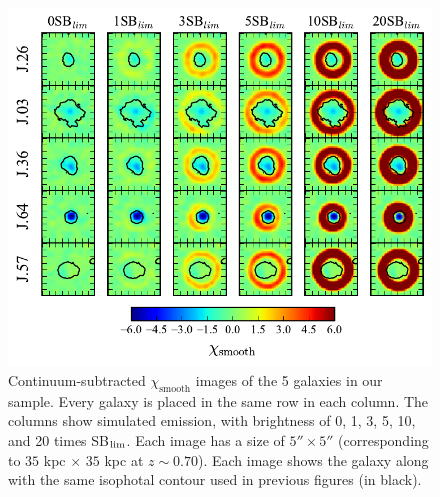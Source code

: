 \documentclass[twocolumn]{aastex61}
\begin{document}
\begin{figure}[p]
\centering
\includegraphics[scale=1.2]{../Figures/sigmas.pdf}
\caption{Continuum-subtracted $\chi_{\text{smooth}}$ images of the 5 galaxies in our sample. Every galaxy is placed in the same row in each column. The columns show simulated emission, with brightness of 0, 1, 3, 5, 10, and 20 times SB$_{\rm lim}$.  Each image has a size of $5'' \times 5''$ (corresponding to $35$ kpc $\times$ $35$ kpc at $z\sim 0.70$). Each image shows the galaxy along with the same isophotal contour used in previous figures (in black).}
\label{fig:sigmas}
\end{figure}
\end{document}
